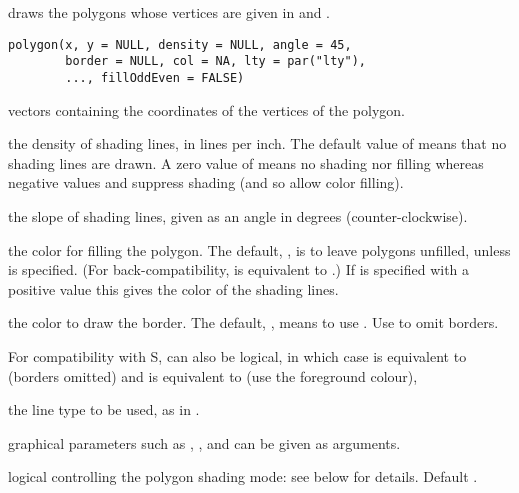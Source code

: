 %
\begin{Description}\relax
{} draws the polygons whose vertices are
given in  and .
\end{Description}
%
\begin{Usage}
\begin{verbatim}
polygon(x, y = NULL, density = NULL, angle = 45,
        border = NULL, col = NA, lty = par("lty"),
        ..., fillOddEven = FALSE)
\end{verbatim}
\end{Usage}
%
\begin{Arguments}
\begin{ldescription}
\item[\code{x,y}] vectors containing the coordinates of the vertices
of the polygon.
\item[\code{density}] the density of shading lines, in lines per inch.  The
default value of  means that no shading lines are drawn.
A zero value of  means no shading nor filling whereas
negative values and  suppress shading (and so allow
color filling).
\item[\code{angle}] the slope of shading lines, given as an angle
in degrees (counter-clockwise).
\item[\code{col}] the color for filling the polygon. The default,
, is to leave polygons unfilled, unless  is
specified.  (For back-compatibility,  is equivalent to
.)  If  is specified with a positive value
this gives the color of the shading lines.
\item[\code{border}] the color to draw the border.  The default, ,
means to use .  Use  to
omit borders.

For compatibility with S,  can also be logical, in
which case  is equivalent to  (borders omitted)
and  is equivalent to  (use the foreground colour),

\item[\code{lty}] the line type to be used, as in .
\item[\code{...}] graphical parameters such as , ,
 and  can be given as arguments.
\item[\code{fillOddEven}] logical controlling the polygon shading mode:  see
below for details.  Default .
\end{ldescription}
\end{Arguments}
